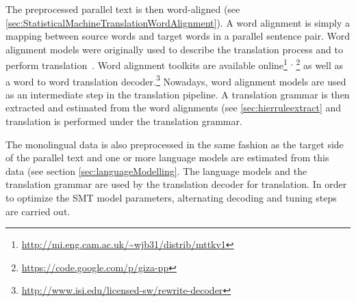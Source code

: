 The preprocessed parallel text is then word-aligned
(see \autoref{sec:StatisticalMachineTranslationWordAlignment}).
A word alignment is simply a mapping between source words and
target words in a parallel sentence pair. Word alignment models
were originally used to describe the translation process and
to perform
translation~\citep{germann-jahr-knight-marcu-yamada:2001:ACL}.
Word alignment toolkits are available
online\footnote{\url{http://mi.eng.cam.ac.uk/~wjb31/distrib/mttkv1}}%
      \textsuperscript{,}%
      \footnote{\url{https://code.google.com/p/giza-pp}}
as well as a word to word translation
decoder.\footnote{\url{http://www.isi.edu/licensed-sw/rewrite-decoder}}
Nowadays, word alignment models are used as an intermediate
step in the translation pipeline.
A translation grammar is then extracted and estimated
from the word alignments (see \autoref{sec:hierruleextract} and
translation is performed under the translation grammar.

The monolingual data is also preprocessed in the same fashion as the
target side of the parallel text and one or more language models are
estimated from this data (see section \autoref{sec:languageModelling}.
The language models and the translation grammar are used by
the translation decoder for translation. In order to optimize
the SMT model parameters, alternating decoding and tuning steps
are carried out.

